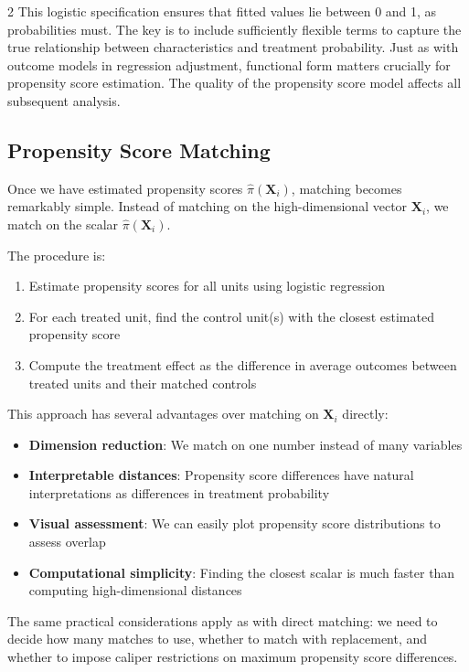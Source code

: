 \documentclass[12pt]{article}
\begin{document}
\begin{multicols}{2}
This logistic specification ensures that fitted values lie between 0 and 1, as probabilities must.
The key is to include sufficiently flexible terms to capture the true relationship between characteristics and treatment probability.
Just as with outcome models in regression adjustment, functional form matters crucially for propensity score estimation.
The quality of the propensity score model affects all subsequent analysis.

\subsection*{Propensity Score Matching}

Once we have estimated propensity scores $\hat{\pi}(\bm{X}_i)$, matching becomes remarkably simple.
Instead of matching on the high-dimensional vector $\bm{X}_i$, we match on the scalar $\hat{\pi}(\bm{X}_i)$.

The procedure is:
\begin{enumerate}
  \item Estimate propensity scores for all units using logistic regression
  \item For each treated unit, find the control unit(s) with the closest estimated propensity score
  \item Compute the treatment effect as the difference in average outcomes between treated units and their matched controls
\end{enumerate}

This approach has several advantages over matching on $\bm{X}_i$ directly:
\begin{itemize}
  \item \textbf{Dimension reduction}: We match on one number instead of many variables
  \item \textbf{Interpretable distances}: Propensity score differences have natural interpretations as differences in treatment probability
  \item \textbf{Visual assessment}: We can easily plot propensity score distributions to assess overlap
  \item \textbf{Computational simplicity}: Finding the closest scalar is much faster than computing high-dimensional distances
\end{itemize}

The same practical considerations apply as with direct matching: we need to decide how many matches to use, whether to match with replacement, and whether to impose caliper restrictions on maximum propensity score differences.


\end{multicols}
\end{document}
